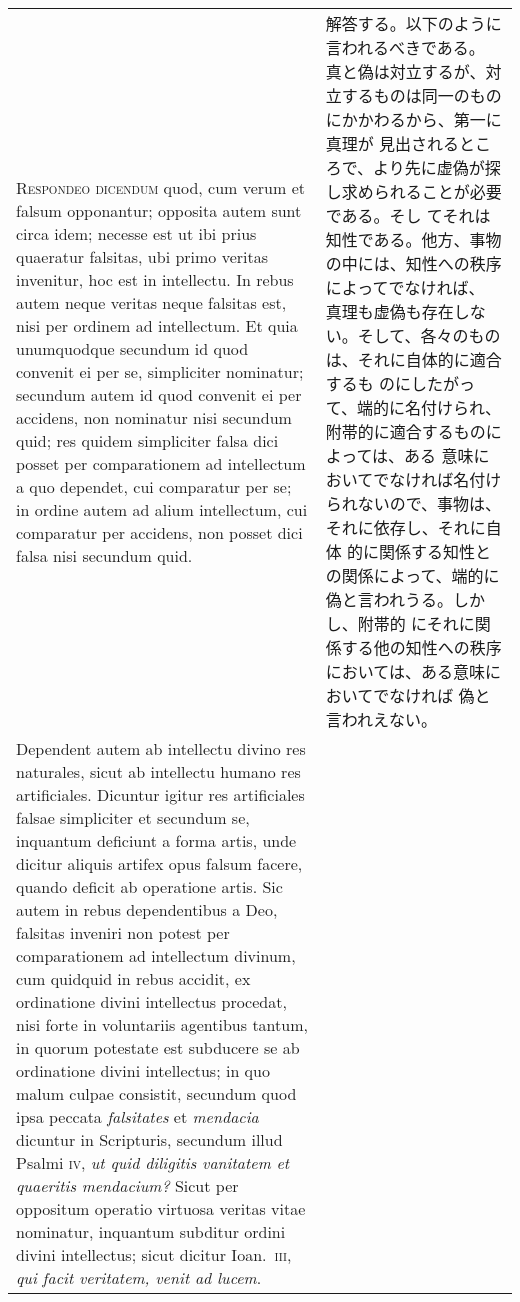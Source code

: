 \documentclass[10pt]{jsarticle} %
\begin{document}
\begin{longtable}{p{21em}p{21em}}
\\


{\scshape Respondeo dicendum} quod, cum verum et falsum
opponantur; opposita autem sunt circa idem; necesse est ut ibi prius
quaeratur falsitas, ubi primo veritas invenitur, hoc est in
intellectu. In rebus autem neque veritas neque falsitas est, nisi per
ordinem ad intellectum. Et quia unumquodque secundum id quod convenit ei
per se, simpliciter nominatur; secundum autem id quod convenit ei per
accidens, non nominatur nisi secundum quid; res quidem simpliciter falsa
dici posset per comparationem ad intellectum a quo dependet, cui
comparatur per se; in ordine autem ad alium intellectum, cui comparatur
per accidens, non posset dici falsa nisi secundum quid. 


&


解答する。以下のように言われるべきである。
真と偽は対立するが、対立するものは同一のものにかかわるから、第一に真理が
 見出されるところで、より先に虚偽が探し求められることが必要である。そし
 てそれは知性である。他方、事物の中には、知性への秩序によってでなければ、
 真理も虚偽も存在しない。そして、各々のものは、それに自体的に適合するも
 のにしたがって、端的に名付けられ、附帯的に適合するものによっては、ある
 意味においてでなければ名付けられないので、事物は、それに依存し、それに自体
 的に関係する知性との関係によって、端的に偽と言われうる。しかし、附帯的
 にそれに関係する他の知性への秩序においては、ある意味においてでなければ
 偽と言われえない。

\\



Dependent autem
ab intellectu divino res naturales, sicut ab intellectu humano res
artificiales. Dicuntur igitur res artificiales falsae simpliciter et
secundum se, inquantum deficiunt a forma artis, unde dicitur aliquis
artifex opus falsum facere, quando deficit ab operatione artis. Sic
autem in rebus dependentibus a Deo, falsitas inveniri non potest per
comparationem ad intellectum divinum, cum quidquid in rebus accidit, ex
ordinatione divini intellectus procedat, nisi forte in voluntariis
agentibus tantum, in quorum potestate est subducere se ab ordinatione
divini intellectus; in quo malum culpae consistit, secundum quod ipsa
peccata {\itshape falsitates} et {\itshape mendacia} dicuntur in Scripturis, secundum illud
Psalmi {\scshape iv}, {\itshape ut quid diligitis vanitatem et quaeritis mendacium?} Sicut per
oppositum operatio virtuosa veritas vitae nominatur, inquantum subditur
ordini divini intellectus; sicut dicitur Ioan.~{\scshape iii}, {\itshape qui facit veritatem,
venit ad lucem}. 




\end{longtable}
\end{document}
